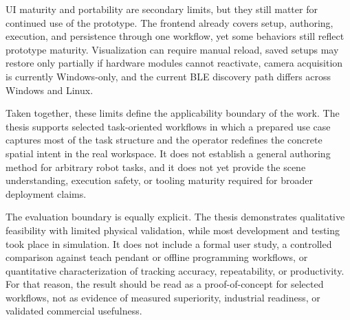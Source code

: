 UI maturity and portability are secondary limits, but they still matter for continued use of the prototype. The frontend already covers setup, authoring, execution, and persistence through one workflow, yet some behaviors still reflect prototype maturity. Visualization can require manual reload, saved setups may restore only partially if hardware modules cannot reactivate, camera acquisition is currently Windows-only, and the current BLE discovery path differs across Windows and Linux.

Taken together, these limits define the applicability boundary of the work. The thesis supports selected task-oriented workflows in which a prepared use case captures most of the task structure and the operator redefines the concrete spatial intent in the real workspace. It does not establish a general authoring method for arbitrary robot tasks, and it does not yet provide the scene understanding, execution safety, or tooling maturity required for broader deployment claims.

The evaluation boundary is equally explicit. The thesis demonstrates qualitative feasibility with limited physical validation, while most development and testing took place in simulation. It does not include a formal user study, a controlled comparison against teach pendant or offline programming workflows, or quantitative characterization of tracking accuracy, repeatability, or productivity. For that reason, the result should be read as a proof-of-concept for selected workflows, not as evidence of measured superiority, industrial readiness, or validated commercial usefulness.
